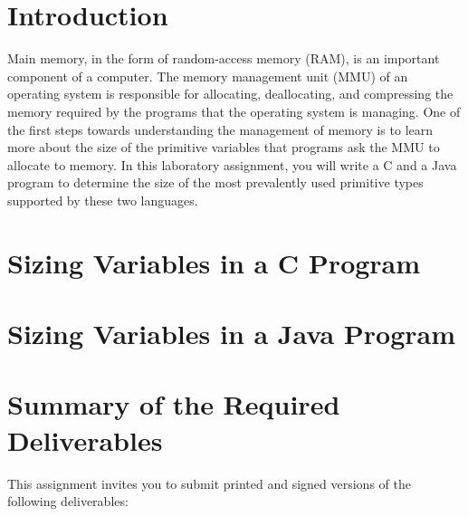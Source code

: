 


\usepackage[compact]{titlesec}



\section*{Introduction}

Main memory, in the form of random-access memory (RAM), is an important component of a computer.  The memory management
unit (MMU) of an operating system is responsible for allocating, deallocating, and compressing the memory required by
the programs that the operating system is managing. One of the first steps towards understanding the management of
memory is to learn more about the size of the primitive variables that programs ask the MMU to allocate to memory. In
this laboratory assignment, you will write a C and a Java program to determine the size of the most prevalently used
primitive types supported by these two languages. 

\section*{Sizing Variables in a C Program}

\section*{Sizing Variables in a Java Program}

\section*{Summary of the Required Deliverables}

This assignment invites you to submit printed and signed versions of the following deliverables: 


